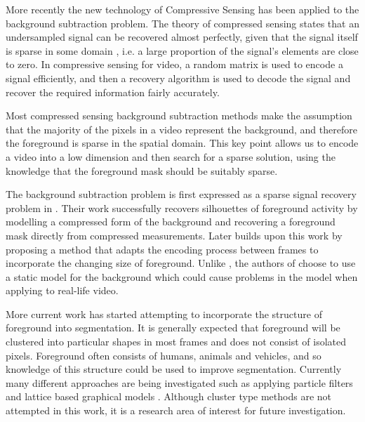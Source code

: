 More recently the new technology of Compressive Sensing \cite{Candes2006, Candes2006a, Donoho2006} has been applied to the background subtraction problem. The theory of compressed sensing states that an undersampled signal can be recovered almost perfectly, given that the signal itself is sparse in some domain \cite{Baraniuk2007}, i.e. a large proportion of the signal's elements are close to zero. In compressive sensing for video, a random matrix is used to encode a signal efficiently, and then a recovery algorithm is used to decode the signal and recover the required information fairly accurately. 

Most compressed sensing background subtraction methods \cite{Cevher2008a, Cevher2008b, Warnell2011, Cossalter2009} make the assumption that the majority of the pixels in a video represent the background, and therefore the foreground is sparse in the spatial domain. This key point allows us to encode a video into a low dimension and then search for a sparse solution, using the knowledge that the foreground mask should be suitably sparse. 

The background subtraction problem is first expressed as a sparse signal recovery problem in \cite{Cevher2008b}. Their work successfully recovers silhouettes of foreground activity by modelling a compressed form of the background and recovering a foreground mask directly from compressed measurements. Later \cite{Warnell2011} builds upon this work by proposing a method that adapts the encoding process between frames to incorporate the changing size of foreground. Unlike \cite{Cevher2008b}, the authors of \cite{Warnell2011} choose to use a static model for the background which could cause problems in the model when applying to real-life video. 

More current work has started attempting to incorporate the structure of foreground into segmentation. It is generally expected that foreground will be clustered into particular shapes in most frames and does not consist of isolated pixels. Foreground often consists of humans, animals and vehicles, and so knowledge of this structure could be used to improve segmentation. Currently many different approaches are being investigated such as applying particle filters \cite{Cossalter2009} and lattice based graphical models \cite{Cevher2008a}. Although cluster type methods are not attempted in this work, it is a research area of interest for future investigation. 


